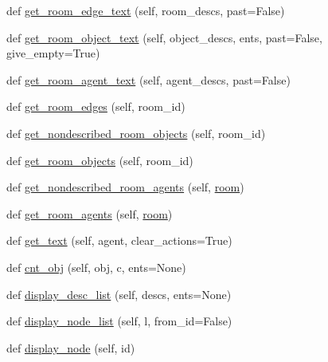 \begin{DoxyCompactItemize}
\item 
def \hyperlink{classlight__chats_1_1graph_1_1Graph_a2588a6f893b108eb25c9125db8036c0a}{get\+\_\+room\+\_\+edge\+\_\+text} (self, room\+\_\+descs, past=False)
\item 
def \hyperlink{classlight__chats_1_1graph_1_1Graph_a4d24052d36cff3896424e2e3bce2d554}{get\+\_\+room\+\_\+object\+\_\+text} (self, object\+\_\+descs, ents, past=False, give\+\_\+empty=True)
\item 
def \hyperlink{classlight__chats_1_1graph_1_1Graph_abe32388ae807a26036573890d1293e2a}{get\+\_\+room\+\_\+agent\+\_\+text} (self, agent\+\_\+descs, past=False)
\item 
def \hyperlink{classlight__chats_1_1graph_1_1Graph_a1d2efb53425d6f495516d656124413c0}{get\+\_\+room\+\_\+edges} (self, room\+\_\+id)
\item 
def \hyperlink{classlight__chats_1_1graph_1_1Graph_a3830f1a541b3a892a6e37c314b5b5205}{get\+\_\+nondescribed\+\_\+room\+\_\+objects} (self, room\+\_\+id)
\item 
def \hyperlink{classlight__chats_1_1graph_1_1Graph_ad078aab1d28474ac43e8b58ba0fb586b}{get\+\_\+room\+\_\+objects} (self, room\+\_\+id)
\item 
def \hyperlink{classlight__chats_1_1graph_1_1Graph_ae8a732327aed100ff96fb2349246738c}{get\+\_\+nondescribed\+\_\+room\+\_\+agents} (self, \hyperlink{classlight__chats_1_1graph_1_1Graph_a90e0b9f3f4a4acc29c49cc730aad1539}{room})
\item 
def \hyperlink{classlight__chats_1_1graph_1_1Graph_a6e638e9bda7cd6e0f6d964d02a22dec6}{get\+\_\+room\+\_\+agents} (self, \hyperlink{classlight__chats_1_1graph_1_1Graph_a90e0b9f3f4a4acc29c49cc730aad1539}{room})
\item 
def \hyperlink{classlight__chats_1_1graph_1_1Graph_a63268fea99420b5cb83436499cd0676b}{get\+\_\+text} (self, agent, clear\+\_\+actions=True)
\item 
def \hyperlink{classlight__chats_1_1graph_1_1Graph_ae416efe86bf6117aec6dc1de481d0ec1}{cnt\+\_\+obj} (self, obj, c, ents=None)
\item 
def \hyperlink{classlight__chats_1_1graph_1_1Graph_a32111f6e4bae319c37f6d8de8dd2bbbe}{display\+\_\+desc\+\_\+list} (self, descs, ents=None)
\item 
def \hyperlink{classlight__chats_1_1graph_1_1Graph_a9c3ce0d845610e465f9a5d9bee1cbd23}{display\+\_\+node\+\_\+list} (self, l, from\+\_\+id=False)
\item 
def \hyperlink{classlight__chats_1_1graph_1_1Graph_a34711f0bfabab728aa51d45bbde67580}{display\+\_\+node} (self, id)

\end{DoxyCompactItemize}
